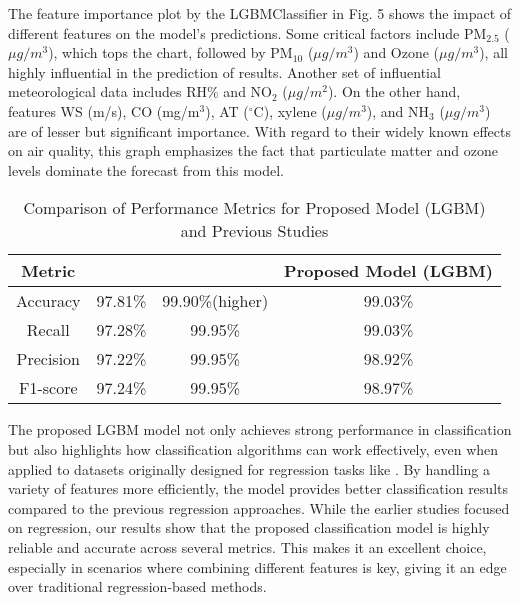 \documentclass[conference]{IEEEtran}
\begin{document}
The feature importance plot by the LGBMClassifier in Fig. 5 shows the impact of different features on the model's predictions. Some critical factors include PM$_{2.5}$ ($\mu g/m^3$), which tops the chart, followed by PM$_{10}$ ($\mu g/m^3$) and Ozone ($\mu g/m^3$), all highly influential in the prediction of results. Another set of influential meteorological data includes RH\% and NO$_2$ ($\mu g/m^2$). On the other hand, features WS (m/s), CO (mg/m$^3$), AT ($^\circ$C), xylene ($\mu g/m^3$), and NH$_3$ ($\mu g/m^3$) are of lesser but significant importance. With regard to their widely known effects on air quality, this graph emphasizes the fact that particulate matter and ozone levels dominate the forecast from this model.

\begin{table}[htbp]
\caption{Comparison of Performance Metrics for Proposed Model (LGBM) and Previous Studies}
\centering
\begin{tabular}{|c|c|c|c|}
\hline
\textbf{Metric} & \textbf{\cite{b15}} & \textbf{\cite{b16}} & \textbf{Proposed Model (LGBM)} \\
\hline
Accuracy & 97.81\% & 99.90\%(higher) & 99.03\% \\
\hline
Recall & 97.28\% & 99.95\% & 99.03\% \\
\hline
Precision & 97.22\% & 99.95\% & 98.92\% \\
\hline
F1-score & 97.24\% & 99.95\% & 98.97\% \\
\hline
\end{tabular}
\end{table}
The proposed LGBM model not only achieves strong performance in classification but also highlights how classification algorithms can work effectively, even when applied to datasets originally designed for regression tasks like \cite{b17}. By handling a variety of features more efficiently, the model provides better classification results compared to the previous regression approaches. While the earlier studies focused on regression, our results show that the proposed classification model is highly reliable and accurate across several metrics. This makes it an excellent choice, especially in scenarios where combining different features is key, giving it an edge over traditional regression-based methods.
\end{document}
